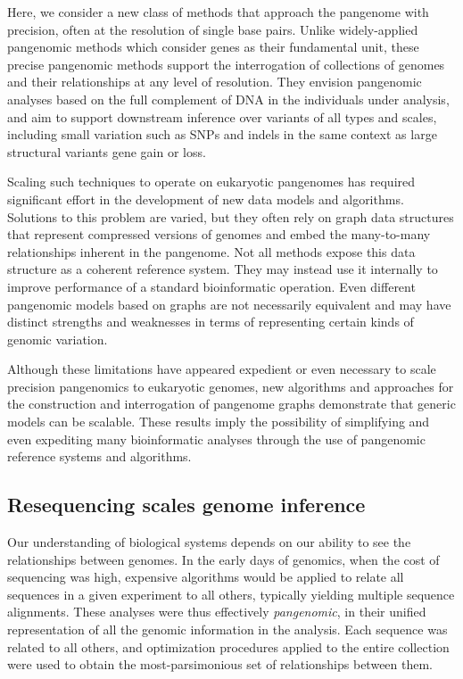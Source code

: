 Here, we consider a new class of methods that approach the pangenome with precision, often at the resolution of single base pairs.
Unlike widely-applied pangenomic methods which consider genes as their fundamental unit, these precise pangenomic methods support the interrogation of collections of genomes and their relationships at any level of resolution.
They envision pangenomic analyses based on the full complement of DNA in the individuals under analysis, and aim to support downstream inference over variants of all types and scales, including small variation such as SNPs and indels in the same context as large structural variants gene gain or loss.

Scaling such techniques to operate on eukaryotic pangenomes has required significant effort in the development of new data models and algorithms.
Solutions to this problem are varied, but they often rely on graph data structures that represent compressed versions of genomes and embed the many-to-many relationships inherent in the pangenome.
Not all methods expose this data structure as a coherent reference system.
They may instead use it internally to improve performance of a standard bioinformatic operation.
Even different pangenomic models based on graphs are not necessarily equivalent and may have distinct strengths and weaknesses in terms of representing certain kinds of genomic variation.

Although these limitations have appeared expedient or even necessary to scale precision pangenomics to eukaryotic genomes, new algorithms and approaches for the construction and interrogation of pangenome graphs demonstrate that generic models can be scalable.
These results imply the possibility of simplifying and even expediting many bioinformatic analyses through the use of pangenomic reference systems and algorithms.

\subsection{Resequencing scales genome inference}

Our understanding of biological systems depends on our ability to see the relationships between genomes.
In the early days of genomics, when the cost of sequencing was high, expensive algorithms would be applied to relate all sequences in a given experiment to all others, typically yielding multiple sequence alignments.
These analyses were thus effectively \emph{pangenomic}, in their unified representation of all the genomic information in the analysis.
Each sequence was related to all others, and optimization procedures applied to the entire collection were used to obtain the most-parsimonious set of relationships between them.

